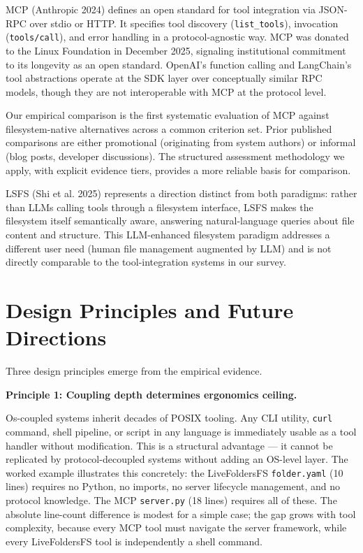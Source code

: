 \documentclass[
  11pt,
]{article}
\begin{document}
MCP (Anthropic 2024) defines an open standard for tool integration via
JSON-RPC over stdio or HTTP. It specifies tool discovery
(\texttt{list\_tools}), invocation (\texttt{tools/call}), and error
handling in a protocol-agnostic way. MCP was donated to the Linux
Foundation in December 2025, signaling institutional commitment to its
longevity as an open standard. OpenAI's function calling and LangChain's
tool abstractions operate at the SDK layer over conceptually similar RPC
models, though they are not interoperable with MCP at the protocol
level.

Our empirical comparison is the first systematic evaluation of MCP
against filesystem-native alternatives across a common criterion set.
Prior published comparisons are either promotional (originating from
system authors) or informal (blog posts, developer discussions). The
structured assessment methodology we apply, with explicit evidence
tiers, provides a more reliable basis for comparison.

LSFS (Shi et al. 2025) represents a direction distinct from both
paradigms: rather than LLMs calling tools through a filesystem
interface, LSFS makes the filesystem itself semantically aware,
answering natural-language queries about file content and structure.
This LLM-enhanced filesystem paradigm addresses a different user need
(human file management augmented by LLM) and is not directly comparable
to the tool-integration systems in our survey.

\hypertarget{design-principles-and-future-directions}{%
\section{Design Principles and Future
Directions}\label{design-principles-and-future-directions}}

Three design principles emerge from the empirical evidence.

\textbf{Principle 1: Coupling depth determines ergonomics ceiling.}

Os-coupled systems inherit decades of POSIX tooling. Any CLI utility,
\texttt{curl} command, shell pipeline, or script in any language is
immediately usable as a tool handler without modification. This is a
structural advantage --- it cannot be replicated by protocol-decoupled
systems without adding an OS-level layer. The worked example illustrates
this concretely: the LiveFoldersFS \texttt{folder.yaml} (10 lines)
requires no Python, no imports, no server lifecycle management, and no
protocol knowledge. The MCP \texttt{server.py} (18 lines) requires all
of these. The absolute line-count difference is modest for a simple
case; the gap grows with tool complexity, because every MCP tool must
navigate the server framework, while every LiveFoldersFS tool is
independently a shell command.
\end{document}
